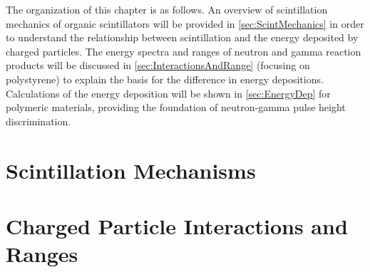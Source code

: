 The organization of this chapter is as follows.
An overview of scintillation mechanics of organic scintillators will be provided in \autoref{sec:ScintMechanics} in order to understand the relationship between scintillation and the energy deposited by charged particles.
The energy spectra and ranges of neutron and gamma reaction products will be discussed in \autoref{sec:InteractionsAndRange} (focusing on polystyrene) to explain the basis for the difference in energy depositions. 
Calculations of the energy deposition will be shown in \autoref{sec:EnergyDep} for polymeric materials, providing the foundation of neutron-gamma pulse height discrimination.

\section{Scintillation Mechanisms}
\label{sec:ScintMechanics}

\section{Charged Particle Interactions and Ranges}
\label{sec:InteractionsAndRange}


